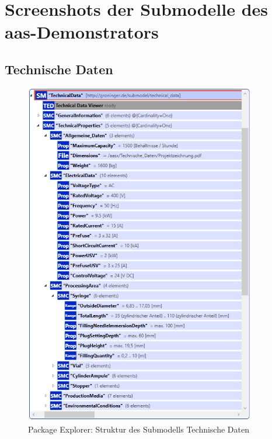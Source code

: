 \newpage
\section{Screenshots der Submodelle des \acs{aas}-Demonstrators}
\label{sec:AnhangSubmodelle}
\subsection{Technische Daten}
\label{subsec:TechnischeDaten}
\begin{figure}[H]
    \centering
        \includegraphics[width=0.9\textwidth]{Bilder/ErgebnissePackageExplorer/TehcnischeDaten.PNG}
    \caption{Package Explorer: Struktur des Submodells Technische Daten}
    \label{fig:SMTechnischeDaten}
\end{figure}
\newpage
